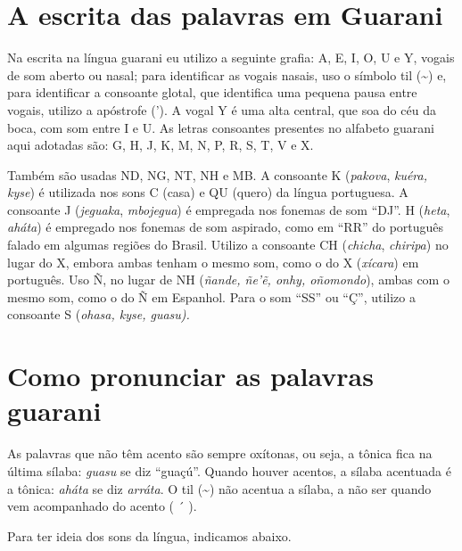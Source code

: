 \chapter{A escrita das palavras em Guarani}

Na escrita na língua guarani eu utilizo a seguinte grafia: A, E, I, O, U
e Y, vogais de som aberto ou nasal; para identificar as vogais nasais,
uso o símbolo til (\textasciitilde{}) e, para identificar a consoante
glotal, que identifica uma pequena pausa entre vogais, utilizo a
apóstrofe ('). A vogal Y é uma alta central, que soa do céu da boca, com
som entre I e U. As letras consoantes presentes no alfabeto guarani aqui
adotadas são: G, H, J, K, M, N, P, R, S, T, V e X.

Também são usadas ND, NG, NT, NH e MB. A consoante K (\emph{pakova},
\emph{kuéra, kyse}) é utilizada nos sons C (casa) e QU (quero) da língua
portuguesa. A consoante J (\emph{jeguaka}, \emph{mbojegua}) é empregada
nos fonemas de som ``DJ''. H (\emph{heta}, \emph{aháta}) é empregado nos
fonemas de som aspirado, como em ``RR'' do português falado em algumas
regiões do Brasil. Utilizo a consoante CH (\emph{chicha},
\emph{chiripa}) no lugar do X, embora ambas tenham o mesmo som, como o
do X (\emph{xícara}) em português. Uso Ñ, no lugar de NH (\emph{ñande,
ñe'ẽ, onhy, oñomondo}), ambas com o mesmo som, como o do Ñ em Espanhol.
Para o som ``SS'' ou ``Ç'', utilizo a consoante S (\emph{ohasa, kyse,
guasu).}


\chapter{Como pronunciar as palavras guarani}

As palavras que não têm acento são sempre oxítonas, ou seja, a tônica
fica na última sílaba: \emph{guasu} se diz ``guaçú''. Quando houver
acentos, a sílaba acentuada é a tônica: \emph{aháta} se diz
\emph{arráta}. O til (\textasciitilde{}) não acentua a sílaba, a não ser
quando vem acompanhado do acento ( ´ ).

Para ter ideia dos sons da língua, indicamos abaixo.

